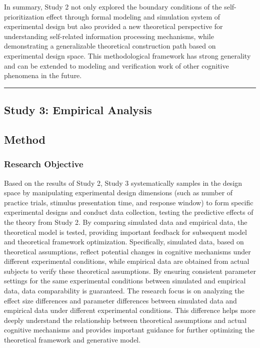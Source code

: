 \documentclass[
  english,
  man,floatsintext]{apa6}
\begin{document}
In summary, Study 2 not only explored the boundary conditions of the self-prioritization effect through formal modeling and simulation system of experimental design but also provided a new theoretical perspective for understanding self-related information processing mechanisms, while demonstrating a generalizable theoretical construction path based on experimental design space. This methodological framework has strong generality and can be extended to modeling and verification work of other cognitive phenomena in the future.

\begin{center}\rule{0.5\linewidth}{0.5pt}\end{center}

\subsection{Study 3: Empirical Analysis}\label{study-3-empirical-analysis}

\subsection{Method}\label{method-2}

\subsubsection{Research Objective}\label{research-objective-2}

Based on the results of Study 2, Study 3 systematically samples in the design space by manipulating experimental design dimensions (such as number of practice trials, stimulus presentation time, and response window) to form specific experimental designs and conduct data collection, testing the predictive effects of the theory from Study 2. By comparing simulated data and empirical data, the theoretical model is tested, providing important feedback for subsequent model and theoretical framework optimization. Specifically, simulated data, based on theoretical assumptions, reflect potential changes in cognitive mechanisms under different experimental conditions, while empirical data are obtained from actual subjects to verify these theoretical assumptions. By ensuring consistent parameter settings for the same experimental conditions between simulated and empirical data, data comparability is guaranteed. The research focus is on analyzing the effect size differences and parameter differences between simulated data and empirical data under different experimental conditions. This difference helps more deeply understand the relationship between theoretical assumptions and actual cognitive mechanisms and provides important guidance for further optimizing the theoretical framework and generative model.
\end{document}
